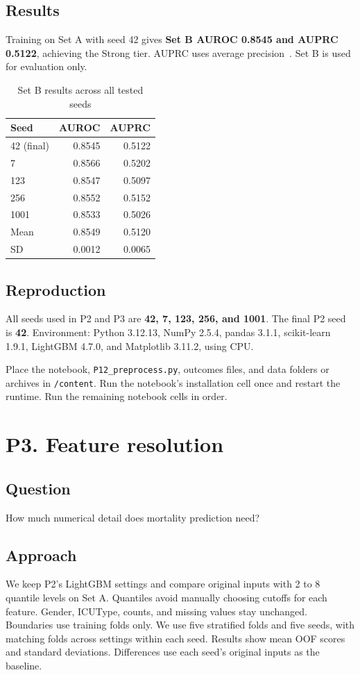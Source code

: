 \documentclass[11pt,a4paper]{article}
\begin{document}
\subsection*{Results}
Training on Set A with seed 42 gives \textbf{Set B AUROC 0.8545 and AUPRC 0.5122}, achieving the Strong tier.
AUPRC uses average precision~\cite{ap}. Set B is used for evaluation only.

\begin{table}[H]
\centering
\caption{Set B results across all tested seeds}\label{tab:seeds}
\begin{tabular}{lrr}
\toprule
Seed & AUROC & AUPRC\\
\midrule
42 (final) & 0.8545 & 0.5122\\
7 & 0.8566 & 0.5202\\
123 & 0.8547 & 0.5097\\
256 & 0.8552 & 0.5152\\
1001 & 0.8533 & 0.5026\\
\midrule
Mean & 0.8549 & 0.5120\\
SD & 0.0012 & 0.0065\\
\bottomrule
\end{tabular}
\end{table}

\subsection*{Reproduction}
All seeds used in P2 and P3 are \textbf{42, 7, 123, 256, and 1001}. The final P2 seed is \textbf{42}.
Environment: Python 3.12.13, NumPy 2.5.4, pandas 3.1.1, scikit-learn 1.9.1,
LightGBM 4.7.0, and Matplotlib 3.11.2, using CPU.

Place the notebook, \texttt{P12\_preprocess.py}, outcomes files, and data folders or archives
in \texttt{/content}. Run the notebook's installation cell once and restart the runtime.
Run the remaining notebook cells in order.

\clearpage
\section*{P3. Feature resolution}
\subsection*{Question}
How much numerical detail does mortality prediction need?

\subsection*{Approach}
We keep P2's LightGBM settings and compare original inputs with 2 to 8 quantile levels on Set A.
Quantiles avoid manually choosing cutoffs for each feature.
Gender, ICUType, counts, and missing values stay unchanged. Boundaries use training folds only.
We use five stratified folds and five seeds, with matching folds across settings within each seed.
Results show mean OOF scores and standard deviations. Differences use each seed's original inputs as the baseline.
\end{document}

